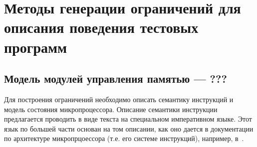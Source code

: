 \chapter{Методы генерации ограничений для описания поведения тестовых программ}

\section{Модель модулей управления памятью --- ???}

Для построения ограничений необходимо описать семантику инструкций и модель состояния микропроцессора. Описание семантики инструкции предлагается проводить в виде текста на специальном императивном языке. Этот язык по большей части основан на том описании, как оно дается в документации по архитектуре микропрцоессора (т.е. его системе инструкций), например, в~\cite{mips64_II}.

